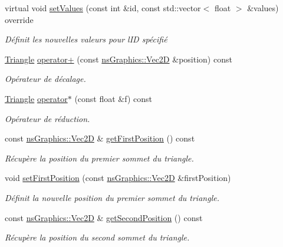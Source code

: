 \begin{DoxyCompactItemize}
virtual void \hyperlink{classns_shape_1_1_triangle_af1c6cb0d5d12d8df0bd66c46ec793b22}{set\+Values} (const int \&id, const std\+::vector$<$ float $>$ \&values) override
\begin{DoxyCompactList}\small\item\em Définit les nouvelles valeurs pour l\textquotesingle{}ID spécifié \end{DoxyCompactList}\item 
\hyperlink{classns_shape_1_1_triangle}{Triangle} \hyperlink{classns_shape_1_1_triangle_a828914e234103dd5efece0030bd6ea12}{operator+} (const \hyperlink{classns_graphics_1_1_vec2_d}{ns\+Graphics\+::\+Vec2D} \&position) const
\begin{DoxyCompactList}\small\item\em Opérateur de décalage. \end{DoxyCompactList}\item 
\hyperlink{classns_shape_1_1_triangle}{Triangle} \hyperlink{classns_shape_1_1_triangle_adf2b03fb750f4269ed8ebfd25b5cb665}{operator$\ast$} (const float \&f) const
\begin{DoxyCompactList}\small\item\em Opérateur de réduction. \end{DoxyCompactList}\item 
const \hyperlink{classns_graphics_1_1_vec2_d}{ns\+Graphics\+::\+Vec2D} \& \hyperlink{classns_shape_1_1_triangle_ad82e289ac4c9fd8cc569b7a79771fc5f}{get\+First\+Position} () const
\begin{DoxyCompactList}\small\item\em Récupère la position du premier sommet du triangle. \end{DoxyCompactList}\item 
void \hyperlink{classns_shape_1_1_triangle_a9cbdb05c4f337961adccadf1aec48b1b}{set\+First\+Position} (const \hyperlink{classns_graphics_1_1_vec2_d}{ns\+Graphics\+::\+Vec2D} \&first\+Position)
\begin{DoxyCompactList}\small\item\em Définit la nouvelle position du premier sommet du triangle. \end{DoxyCompactList}\item 
const \hyperlink{classns_graphics_1_1_vec2_d}{ns\+Graphics\+::\+Vec2D} \& \hyperlink{classns_shape_1_1_triangle_a0222c889721e15942fde8719727da6ef}{get\+Second\+Position} () const
\begin{DoxyCompactList}\small\item\em Récupère la position du second sommet du triangle. \end{DoxyCompactList}\item 

\end{DoxyCompactItemize}
